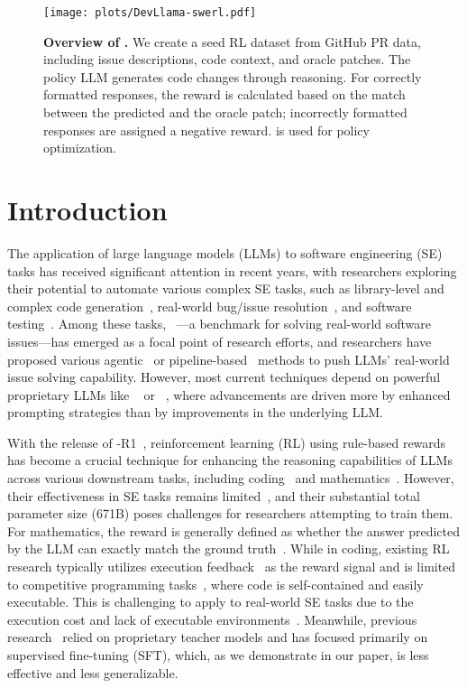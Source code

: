 \begin{figure}[b!]
\centering
\texttt{[image: plots/DevLlama-swerl.pdf]}
\caption{\textbf{Overview of \tech{}.}
We create a seed RL dataset from GitHub PR data, including issue descriptions, code context, and oracle patches. The policy LLM generates code changes through reasoning.
For correctly formatted responses, the reward is calculated based on the match between the predicted and the oracle patch; 
incorrectly formatted responses are assigned a negative reward.
\grpo is used for policy optimization.}
\label{fig:overview}
\end{figure}


\section{Introduction}
\label{section:intro}

The application of large language models (LLMs) to software engineering (SE) tasks has received significant attention in recent years, with researchers exploring their potential to automate various complex SE tasks,
such as library-level and complex code generation~\cite{bigcodebench,commit0},
real-world bug/issue resolution~\cite{alpharepair, swebench,swebenchm},
and software testing~\cite{titanfuzz, testgeneval}.
Among these tasks, \swebench~\cite{swebench}---a benchmark for solving real-world software issues---has emerged as a focal point of research efforts, and researchers have proposed various agentic~\cite{sweagent,openhands,aider} or pipeline-based~\cite{agentless,moatless,autocoderover} methods to push LLMs' real-world issue solving capability.
However, most current techniques depend on powerful proprietary LLMs like ~\cite{gpt4o} or \sonnet~\cite{claude35}, where advancements are driven more by enhanced prompting strategies than by improvements in the underlying LLM.

With the release of \dpsk-R1~\cite{deepseekr1}, reinforcement learning (RL) using rule-based rewards has become a crucial technique for enhancing the reasoning capabilities of LLMs across various downstream tasks, including coding~\cite{acecoder} and mathematics~\cite{cotstudy}.
However, their effectiveness in SE tasks remains limited~\cite{deepseekr1}, and their substantial total parameter size (671B) poses challenges for researchers attempting to train them.
For mathematics, the reward is generally defined as whether the answer predicted by the LLM can exactly match the ground truth~\cite{deepseekr1}.
While in coding, existing RL research typically utilizes execution feedback~\cite{rlef} as the reward signal and is limited to competitive programming tasks~\cite{codecontests,lcb}, where code is self-contained and easily executable.
This is challenging to apply to real-world SE tasks due to the execution cost and lack of executable environments~\cite{swegym}.
Meanwhile, previous research~\cite{swegpt,swegym,swefixer} relied on proprietary teacher models and has focused primarily on supervised fine-tuning (SFT), which, as we demonstrate in our paper, is less effective and less generalizable.




